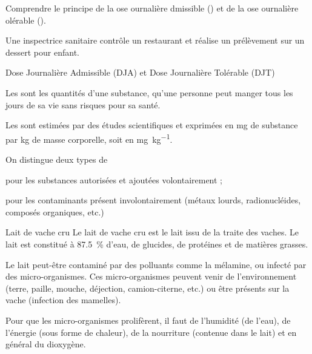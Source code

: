 \teteTermStssAlim
{}


\begin{objectifs}
  \item Comprendre le principe de la ose ournalière dmissible ()
  et de la ose ournalière olérable ().
\end{objectifs}

\begin{contexte}
  Une inspectrice sanitaire contrôle un restaurant et réalise un prélèvement sur un dessert pour enfant.

\end{contexte}


\begin{doc}{Dose Journalière Admissible (DJA) et Dose Journalière Tolérable (DJT)}
  \begin{importants}
    Les  sont les quantités d'une substance, qu'une personne peut manger tous les jours de sa vie sans risques pour sa santé.
  \end{importants}  

  Les  sont estimées par des études scientifiques et exprimées en \unit{\mg} de substance par \unit{\kg} de masse corporelle, soit en \unit{\mg\per\kg}.

  \begin{importants}
    On distingue deux types de 
    \begin{listePoints}  
      \item {} pour les substances autorisées et ajoutées volontairement ;
      \item {} pour les contaminants présent involontairement (métaux lourds, radionucléides, composés organiques, etc.)
    \end{listePoints}
  \end{importants}
\end{doc}

\begin{doc}{Lait de vache cru}
  Le lait de vache cru est le lait issu de la traite des vaches.
  Le lait est constitué à \qty{87,5}{\percent} d'eau, de glucides, de protéines et de matières grasses.

  Le lait peut-être contaminé par des polluants comme la mélamine, ou infecté par des micro-organismes.
  Ces micro-organismes peuvent venir de l'environnement (terre, paille, mouche, déjection, camion-citerne, etc.) ou être présents sur la vache (infection des mamelles).

  Pour que les micro-organismes prolifèrent, il faut de l'humidité (de l'eau), de l'énergie (sous forme de chaleur), de la nourriture (contenue dans le lait) et en général du dioxygène.
\end{doc}

